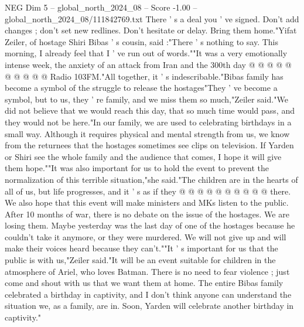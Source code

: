 \begin{textsample}{NEG Dim 5 – global\_north\_2024\_08 – Score -1.00 – global\_north\_2024\_08/111842769.txt}
There ' s a deal you ' ve signed.
Don't add changes ; don't set new redlines.
Don't hesitate or delay.
Bring them home."Yifat Zeiler, of hostage Shiri Bibas ' s cousin, said :"There ' s nothing to say.
This morning, I already feel that I ' ve run out of words.""It was a very emotionally intense week, the anxiety of an attack from Iran and the 300th day @ @ @ @ @ @ @ @ @ @ Radio 103FM."All together, it ' s indescribable."Bibas family has become a symbol of the struggle to release the hostages"They ' ve become a symbol, but to us, they ' re family, and we miss them so much,"Zeiler said."We did not believe that we would reach this day, that so much time would pass, and they would not be here."In our family, we are used to celebrating birthdays in a small way.
Although it requires physical and mental strength from us, we know from the returnees that the hostages sometimes see clips on television.
If Yarden or Shiri see the whole family and the audience that comes, I hope it will give them hope.""It was also important for us to hold the event to prevent the normalization of this terrible situation,"she said."The children are in the hearts of all of us, but life progresses, and it ' s as if they @ @ @ @ @ @ @ @ @ @ there.
We also hope that this event will make ministers and MKs listen to the public.
After 10 months of war, there is no debate on the issue of the hostages.
We are losing them.
Maybe yesterday was the last day of one of the hostages because he couldn't take it anymore, or they were murdered.
We will not give up and will make their voices heard because they can't.""It ' s important for us that the public is with us,"Zeiler said."It will be an event suitable for children in the atmosphere of Ariel, who loves Batman.
There is no need to fear violence ; just come and shout with us that we want them at home.
The entire Bibas family celebrated a birthday in captivity, and I don't think anyone can understand the situation we, as a family, are in.
Soon, Yarden will celebrate another birthday in captivity."

\end{textsample}
